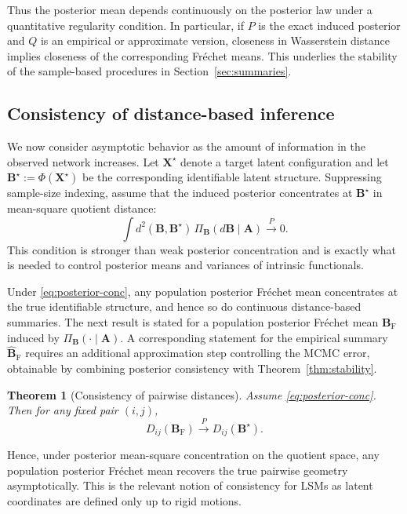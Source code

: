 \documentclass[12pt]{article}
\newcommand{\bfA}{\boldsymbol{A}}
\newcommand{\bfB}{\boldsymbol{B}}
\newcommand{\bfX}{\boldsymbol{X}}
\newcommand{\Frechet}{Fr\'{e}chet\xspace}
\newcommand{\BhatF}{\widehat{\bfB}_{\mathrm{F}}}
\newcommand{\BF}{\bfB_{\mathrm{F}}}
\newtheorem{theorem}{Theorem}
\begin{document}
Thus the posterior mean depends continuously on the posterior law under a quantitative regularity
condition. In particular, if $P$ is the exact induced posterior and $Q$ is an empirical or
approximate version, closeness in Wasserstein distance implies closeness of the corresponding
\Frechet means. This underlies the stability of the sample-based procedures in
Section~\ref{sec:summaries}.

\subsection{Consistency of distance-based inference}\label{subsec:consistency}

We now consider asymptotic behavior as the amount of information in the observed network increases.
Let $\bfX^\star$ denote a target latent configuration and let
$
\bfB^\star := \Phi(\bfX^\star)
$
be the corresponding identifiable latent structure. Suppressing sample-size indexing, assume that
the induced posterior concentrates at $\bfB^\star$ in mean-square quotient distance:
\begin{equation}\label{eq:posterior-conc}
\int d^2(\bfB,\bfB^\star)\,\Pi_{\bfB}(d\bfB\mid \bfA)\xrightarrow{P}0.
\end{equation}
This condition is stronger than weak posterior concentration and is exactly what is needed to
control posterior means and variances of intrinsic functionals.

Under \eqref{eq:posterior-conc}, any population posterior \Frechet mean concentrates at the true
identifiable structure, and hence so do continuous distance-based summaries. The next result is
stated for a population posterior \Frechet mean $\BF$ induced by $\Pi_{\bfB}(\cdot\mid\bfA)$. A
corresponding statement for the empirical summary $\BhatF$ requires an additional approximation step
controlling the MCMC error, obtainable by combining posterior consistency with
Theorem~\ref{thm:stability}.

\begin{theorem}[Consistency of pairwise distances]\label{thm:dist-cons}
Assume \eqref{eq:posterior-conc}. Then for any fixed pair $(i,j)$,
\[
D_{ij}(\BF) \xrightarrow{P} D_{ij}(\bfB^\star).
\]
\end{theorem}

Hence, under posterior mean-square concentration on the quotient space, any population posterior
\Frechet mean recovers the true pairwise geometry asymptotically. This is the relevant notion of
consistency for LSMs as latent coordinates are defined only up to rigid motions.
\end{document}
